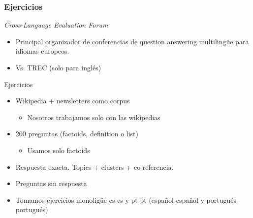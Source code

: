 \fontsize{9.5pt}{8.2}\selectfont
\begin{frame}[<+->]
\frametitle{Ejercicios}
  \textit{Cross-Language Evaluation Forum}
  \begin{itemize}
    \item Principal organizador de conferencias de question answering multilingüe para idiomas europeos.
    \item Vs. TREC (solo para inglés)
  \end{itemize}
  Ejercicios
  \begin{itemize}
    \item Wikipedia + newsletters como corpus
    \begin{itemize}
      \item Nosotros trabajamos solo con las wikipedias
    \end{itemize}
    \item 200 preguntas (factoids, definition o list) 
    \begin{itemize}
      \item Usamos solo factoids
    \end{itemize}
    \item Respuesta exacta. Topics + clusters + co-referencia.
    \item Preguntas sin respuesta
    \item Tomamos ejercicios monoligüe es-es y pt-pt (español-español y portugués-portugués)
  \end{itemize}
\end{frame}



